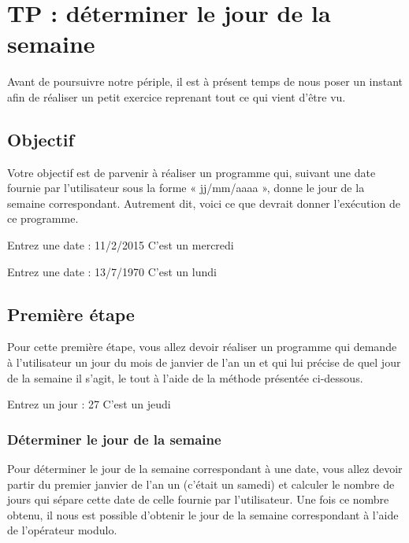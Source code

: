 \chapter{TP : déterminer le jour de la semaine}
\label{TP-:-determiner-le-jour-de-la-semaine }

Avant de poursuivre notre périple, il est à présent temps de nous poser un
instant afin de réaliser un petit exercice reprenant tout ce qui vient
d'être vu.

\section{Objectif}
\label{objectif }

Votre objectif est de parvenir à réaliser un programme qui,
suivant une date fournie par l'utilisateur sous la forme « jj/mm/aaaa »,
donne le jour de la semaine correspondant. Autrement dit, voici ce que
devrait donner l'exécution de ce programme.

\begin{C}
Entrez une date : 11/2/2015
C'est un mercredi

Entrez une date : 13/7/1970
C'est un lundi
\end{C}

\section{Première étape}
\label{premiere-etape }

Pour cette première étape, vous allez devoir réaliser un programme qui
demande à l'utilisateur un jour du mois de janvier de l'an un et qui lui
précise de quel jour de la semaine il s'agit, le tout à l'aide de la
méthode présentée ci-dessous.

\begin{C}
Entrez un jour : 27
C’est un jeudi
\end{C}

\subsection{Déterminer le jour de la semaine}
\label{determiner-le-jour-de-la-semaine}

Pour déterminer le jour de la semaine correspondant à une date, vous
allez devoir partir du premier janvier de l'an un (c'était un samedi) et
calculer le nombre de jours qui sépare cette date de celle fournie par
l'utilisateur. Une fois ce nombre obtenu, il nous est possible d'obtenir
le jour de la semaine correspondant à l'aide de l'opérateur modulo.

